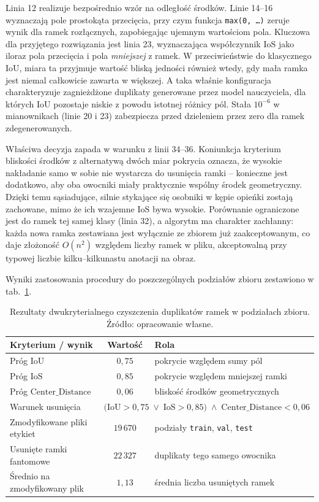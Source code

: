 Linia 12 realizuje bezpośrednio wzór na odległość środków. Linie 14--16 wyznaczają pole prostokąta przecięcia, przy czym funkcja \texttt{max(0, \ldots)} zeruje wynik dla ramek rozłącznych, zapobiegając ujemnym wartościom pola. Kluczowa dla przyjętego rozwiązania jest linia 23, wyznaczająca współczynnik $\mathrm{IoS}$ jako iloraz pola przecięcia i pola \emph{mniejszej} z ramek. W przeciwieństwie do klasycznego $\mathrm{IoU}$, miara ta przyjmuje wartość bliską jedności również wtedy, gdy mała ramka jest niemal całkowicie zawarta w większej. A taka właśnie konfiguracja charakteryzuje zagnieżdżone duplikaty generowane przez model nauczyciela, dla których $\mathrm{IoU}$ pozostaje niskie z powodu istotnej różnicy pól. Stała $10^{-6}$ w mianownikach (linie 20 i 23) zabezpiecza przed dzieleniem przez zero dla ramek zdegenerowanych.

Właściwa decyzja zapada w warunku z linii 34--36. Koniunkcja kryterium bliskości środków z alternatywą dwóch miar pokrycia oznacza, że wysokie nakładanie samo w sobie nie wystarcza do usunięcia ramki – konieczne jest dodatkowo, aby oba owocniki miały praktycznie wspólny środek geometryczny. Dzięki temu sąsiadujące, silnie stykające się osobniki w kępie opieńki zostają zachowane, mimo że ich wzajemne $\mathrm{IoS}$ bywa wysokie. Porównanie ograniczone jest do ramek tej samej klasy (linia 32), a algorytm ma charakter zachłanny: każda nowa ramka zestawiana jest wyłącznie ze zbiorem już zaakceptowanym, co daje złożoność $O(n^2)$ względem liczby ramek w pliku, akceptowalną przy typowej liczbie kilku--kilkunastu anotacji na obraz.

Wyniki zastosowania procedury do poszczególnych podziałów zbioru zestawiono w tab.~\ref{tab:nms_cleanup}.

\begin{table}[htbp]
 \centering
 \caption{Rezultaty dwukryterialnego czyszczenia duplikatów ramek w podziałach zbioru. Źródło: opracowanie własne.}
 \label{tab:nms_cleanup}
 \begin{tabular}{|p{5.2cm}|c|p{4.8cm}|}
 \hline
 \textbf{Kryterium / wynik} & \textbf{Wartość} & \textbf{Rola} \\
 \hline \hline
 Próg $\mathrm{IoU}$ & $0{,}75$ & pokrycie względem sumy pól \\
 \hline
 Próg $\mathrm{IoS}$ & $0{,}85$ & pokrycie względem mniejszej ramki \\
 \hline
 Próg $\mathrm{Center\_Distance}$ & $0{,}06$ & bliskość środków geometrycznych \\
 \hline
 Warunek usunięcia & \multicolumn{2}{p{9.5cm}|}{$\bigl(\mathrm{IoU}>0{,}75 \;\lor\; \mathrm{IoS}>0{,}85\bigr) \;\land\; \mathrm{Center\_Distance}<0{,}06$} \\
 \hline \hline
 Zmodyfikowane pliki etykiet & $19\,670$ & podziały \texttt{train}, \texttt{val}, \texttt{test} \\
 \hline
 Usunięte ramki fantomowe & $22\,327$ & duplikaty tego samego owocnika \\
 \hline
 Średnio na zmodyfikowany plik & $1{,}13$ & średnia liczba usuniętych ramek \\
 \hline
 \end{tabular}
\end{table}

